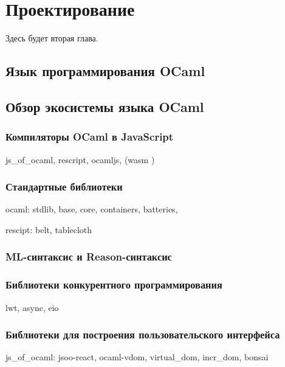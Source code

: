 \chapter{Проектирование}

Здесь будет вторая глава. \TODO

\section{Язык программирования OCaml}

\TODO

\section{Обзор экосистемы языка OCaml}

\TODO

\subsection{Компиляторы OCaml в JavaScript}

js\_of\_ocaml, rescript, ocamljs, (wasm \TODO) \TODO

\subsection{Стандартные библиотеки}

\TODO

ocaml: stdlib, base, core, containers, batteries, 

rescipt: belt, tablecloth 

\subsection{ML-синтаксис и Reason-синтаксис}

\TODO

\subsection{Библиотеки конкурентного программирования}

lwt, async, eio \TODO

\subsection{Библиотеки для построения пользовательского интерфейса}

\TODO

js\_of\_ocaml: jsoo-react, ocaml-vdom, virtual\_dom, incr\_dom, bonsai

